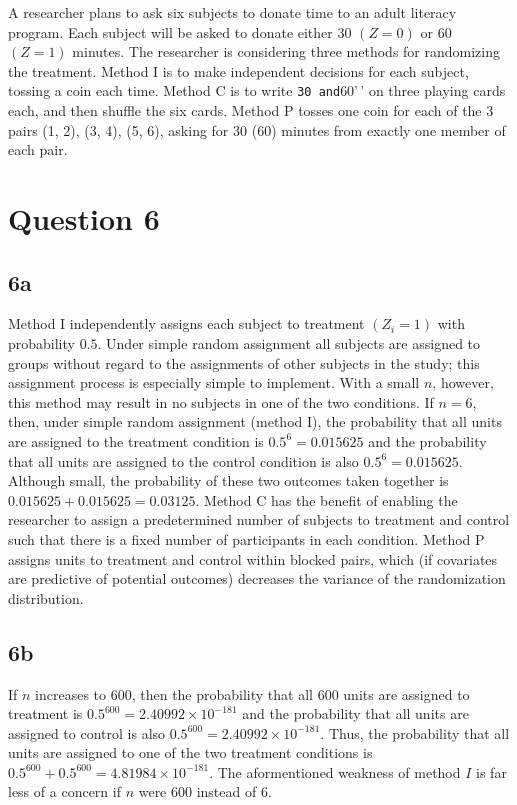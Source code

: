\documentclass[
  12pt,
  leqno]{article}
\begin{document}
A researcher plans to ask six subjects to donate time to an adult
literacy program. Each subject will be asked to donate either \(30\)
\((Z = 0)\) or \(60\) \((Z = 1)\) minutes. The researcher is considering
three methods for randomizing the treatment. Method I is to make
independent decisions for each subject, tossing a coin each time. Method
C is to write \texttt{30\textquotesingle{}\textquotesingle{}\ and}60'\,'
on three playing cards each, and then shuffle the six cards. Method P
tosses one coin for each of the 3 pairs (1, 2), (3, 4), (5, 6), asking
for 30 (60) minutes from exactly one member of each pair.

\section*{Question 6}

\subsection*{6a}

Method I independently assigns each subject to treatment \((Z_i=1)\)
with probability \(0.5\). Under simple random assignment all subjects
are assigned to groups without regard to the assignments of other
subjects in the study; this assignment process is especially simple to
implement. With a small \(n\), however, this method may result in no
subjects in one of the two conditions. If \(n = 6\), then, under simple
random assignment (method I), the probability that all units are
assigned to the treatment condition is \(0.5^6 = 0.015625\) and the
probability that all units are assigned to the control condition is also
\(0.5^6 = 0.015625\). Although small, the probability of these two
outcomes taken together is \(0.015625 + 0.015625 = 0.03125\). Method C
has the benefit of enabling the researcher to assign a predetermined
number of subjects to treatment and control such that there is a fixed
number of participants in each condition. Method P assigns units to
treatment and control within blocked pairs, which (if covariates are
predictive of potential outcomes) decreases the variance of the
randomization distribution.

\subsection*{6b}

If \(n\) increases to \(600\), then the probability that all \(600\)
units are assigned to treatment is
\(0.5^{600} = 2.40992 \times 10^{-181}\) and the probability that all
units are assigned to control is also
\(0.5^{600} = 2.40992 \times 10^{-181}\). Thus, the probability that all
units are assigned to one of the two treatment conditions is
\(0.5^{600} + 0.5^{600} = 4.81984 \times 10^{-181}\). The aformentioned
weakness of method \(I\) is far less of a concern if \(n\) were \(600\)
instead of \(6\).
\end{document}
